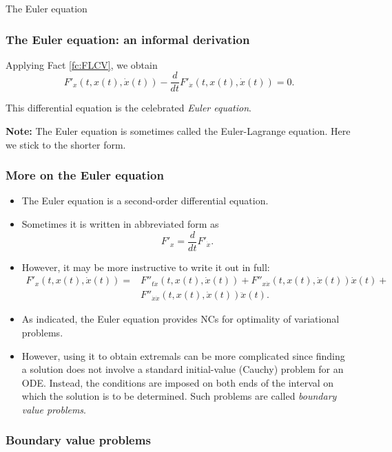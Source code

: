 \documentclass[10pt]{beamer}
\theoremstyle{definition}
\begin{document}
\begin{section}{The Euler equation}
\begin{frame}[fragile]
\frametitle{The Euler equation: an informal derivation}
Applying Fact \ref{fc:FLCV}, we obtain \begin{equation}
F'_x(t,x(t),\dot{x}(t)) - \frac{d}{dt}F'_{\dot{x}}(t,x(t),\dot{x}(t)) = 0.
\label{eq:Euler}
\end{equation}

This differential equation is the celebrated \emph{Euler equation}.\bigskip

\textbf{Note:} The Euler equation is sometimes called the Euler-Lagrange equation. Here we stick to the shorter form.
\end{frame}

\begin{frame}[fragile]
\frametitle{More on the Euler equation}
\begin{itemize}
\item The Euler equation is a second-order differential equation.
\item Sometimes it is written in abbreviated form as \[ F'_x = \frac{d}{dt}F'_{\dot{x}}. \]
\item However, it may be more instructive to write it out in full:
\[ \begin{split}
F'_x(t,x(t),\dot{x}(t)) = & F''_{t\dot{x}}(t,x(t),\dot{x}(t))+ F''_{x\dot{x}}(t,x(t),\dot{x}(t))\dot{x}(t)+\\
& F''_{\dot{x}\dot{x}}(t,x(t),\dot{x}(t))\ddot{x}(t).
\end{split}  \]
\item As indicated, the Euler equation provides NCs for optimality of variational problems.
\item However, using it to obtain extremals can be more complicated since finding a solution does not involve a standard initial-value (Cauchy) problem for an ODE. Instead, the conditions are imposed on both ends of the interval on which the solution is to be determined. Such problems are called \emph{boundary value problems}.
\end{itemize}
\end{frame}

\begin{frame}[fragile]
\frametitle{Boundary value problems}

\end{frame}










\end{section}
\end{document}
